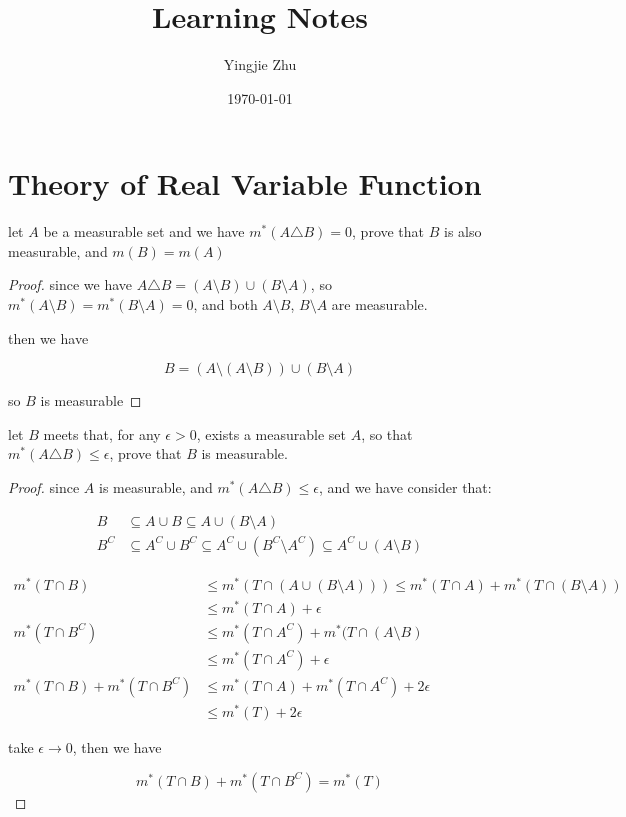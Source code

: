 \documentclass[11pt,a4paper]{article}
\title{Learning Notes}
\author{Yingjie Zhu}
\date{\today}
\begin{document}
\maketitle

\section{Theory of Real Variable Function}

\begin{exercise}
    let $A$ be a measurable set and we have $m^*(A \triangle B) = 0$, prove that $B$ is also measurable, and $m(B) = m(A)$
\end{exercise}

\begin{proof}
    since we have $A \triangle B = \left( A \setminus B \right) \cup \left( B \setminus A \right)$, so 
    $m^*(A \setminus B) = m^*(B \setminus A) = 0$, and both $A \setminus B$, $B \setminus A$ are measurable.

    then we have

    \[
        B = (A \setminus (A \setminus B)) \cup (B \setminus A)
    \]

    so $B$ is measurable
\end{proof}

\begin{exercise}
    let $B$ meets that, for any $\epsilon > 0$, exists a measurable set $A$, so that $m^*(A \triangle B) \le \epsilon$, prove that
    $B$ is measurable.
\end{exercise}


\begin{proof}
    since $A$ is measurable, and $m^*(A \triangle B) \le \epsilon$, and we have
    consider that:

    \begin{align*}
        B &\subseteq A \cup B \subseteq A \cup (B \setminus A) \\
        B^C & \subseteq A^C \cup B^C \subseteq A^C \cup (B^C \setminus A^C) \subseteq A^C \cup (A \setminus B) 
    \end{align*}

    \begin{align*}
        m^*(T \cap B) &\le m^*(T \cap (A \cup (B \setminus A))) \le m^*(T \cap A) + m^*(T \cap (B \setminus A)) \\
        & \le m^*(T \cap A) + \epsilon \\
        m^*(T \cap B^C) & \le m^*(T \cap A^C) + m^*(T \cap (A \setminus B) \\
        & \le m^*(T \cap A^C) + \epsilon \\
m^*(T \cap B) + m^*(T \cap B^C) & \le  m^*(T \cap A) +  m^*(T \cap A^C) + 2\epsilon \\
& \le m^*(T) + 2\epsilon
    \end{align*}


take $\epsilon \to 0$, then we have

\[
m^*(T \cap B) + m^*(T \cap B^C) = m^*(T)
\]

\end{proof}
\end{document}
